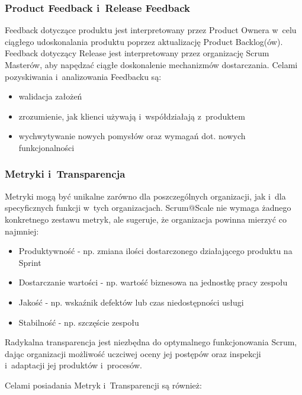 \documentclass[12pt,a4paper,parskip=full]{scrartcl}
\begin{document}
\subsubsection{Product Feedback i~Release Feedback}\label{product-feedback-and-release-feedback}

Feedback dotyczące produktu jest interpretowany przez Product Ownera w~celu ciągłego udoskonalania produktu poprzez aktualizację Product Backlog(ów). Feedback dotyczący Release jest interpretowany przez organizację Scrum Masterów, aby napędzać ciągłe doskonalenie mechanizmów dostarczania. Celami pozyskiwania i~analizowania Feedbacku są:

\begin{itemize}
\itemsep1pt\parskip0pt
\item
  walidacja założeń
\item
  zrozumienie, jak klienci używają i~współdziałają z~produktem
\item
  wychwytywanie nowych pomysłów oraz wymagań dot. nowych funkcjonalności
\end{itemize}

\subsubsection{Metryki i~Transparencja}\label{Metrics-and-transparency}

Metryki mogą być unikalne zarówno dla poszczególnych organizacji, jak i~dla specyficznych funkcji w~tych organizacjach. Scrum@Scale nie wymaga żadnego konkretnego zestawu metryk, ale sugeruje, że organizacja powinna mierzyć co najmniej:

\begin{itemize}
\itemsep1pt\parskip0pt
\item
  Produktywność - np. zmiana ilości dostarczonego działającego produktu na Sprint
\item
  Dostarczanie wartości - np. wartość biznesowa na jednostkę pracy zespołu
\item
  Jakość - np. wskaźnik defektów lub czas niedostępności usługi
\item
  Stabilność - np. szczęście zespołu
\end{itemize}

Radykalna transparencja jest niezbędna do optymalnego funkcjonowania Scrum, dając organizacji możliwość uczciwej oceny jej postępów oraz inspekcji i~adaptacji jej produktów i~procesów.

Celami posiadania Metryk i~Transparencji są również:
\end{document}
